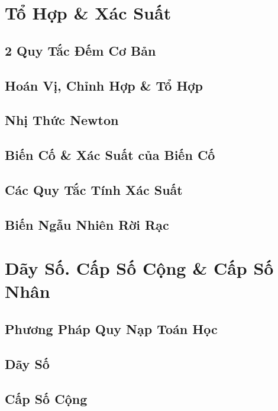 \documentclass[oneside]{book}
\numberwithin{equation}{section}
\begin{document}

\chapter{Tổ Hợp \& Xác Suất}

\section{2 Quy Tắc Đếm Cơ Bản}

\section{Hoán Vị, Chỉnh Hợp \& Tổ Hợp}

\section{Nhị Thức Newton}

\section{Biến Cố \& Xác Suất của Biến Cố}

\section{Các Quy Tắc Tính Xác Suất}

\section{Biến Ngẫu Nhiên Rời Rạc}


\chapter{Dãy Số. Cấp Số Cộng \& Cấp Số Nhân}

\section{Phương Pháp Quy Nạp Toán Học}

\section{Dãy Số}

\section{Cấp Số Cộng}
\end{document}
